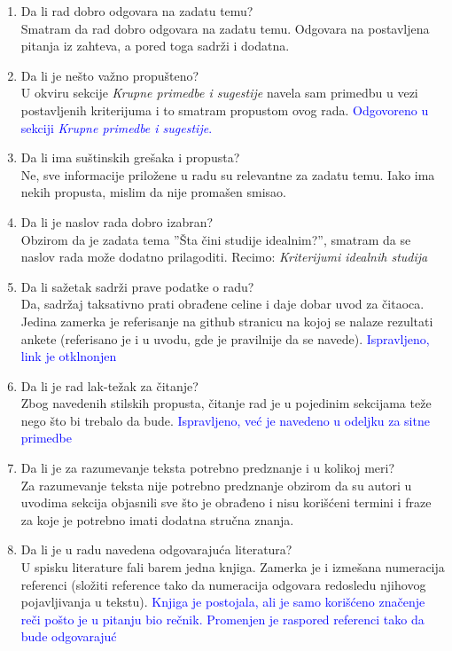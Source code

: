 \documentclass[a4paper]{report}
\newcommand{\odgovor}[1]{\textcolor{blue}{#1}}
\begin{document}
 \begin{enumerate}
 \item Da li rad dobro odgovara na zadatu temu?\\
 Smatram da rad dobro odgovara na zadatu temu. Odgovara na postavljena pitanja iz zahteva, a pored toga sadrži i dodatna.
 
 \item Da li je nešto važno propušteno?\\
 U okviru sekcije \textit{Krupne primedbe i sugestije} navela sam primedbu u vezi postavljenih kriterijuma i to smatram propustom ovog rada.
 \odgovor{Odgovoreno u sekciji \textit{Krupne primedbe i sugestije}.}
 
 \item Da li ima suštinskih grešaka i propusta?\\
 Ne, sve informacije priložene u radu su relevantne za zadatu temu. Iako ima nekih propusta, mislim da nije promašen smisao.
 
 \item Da li je naslov rada dobro izabran?\\
 Obzirom da je zadata tema ''Šta čini studije idealnim?'', smatram da se naslov rada može dodatno prilagoditi. Recimo: \textit{Kriterijumi idealnih studija}
 \odgovor{}
 
 \item Da li sažetak sadrži prave podatke o radu?\\
 Da, sadržaj taksativno prati obrađene celine i daje dobar uvod za čitaoca. Jedina zamerka je referisanje na github stranicu na kojoj se nalaze rezultati ankete (referisano je i u uvodu, gde je pravilnije da se navede).
 \odgovor{Ispravljeno, link je otklnonjen}
 
 \item Da li je rad lak-težak za čitanje?\\
 Zbog navedenih stilskih propusta, čitanje rad je u pojedinim sekcijama teže nego što bi trebalo da bude.
 \odgovor {Ispravljeno, već je navedeno u odeljku za sitne primedbe}
 
 \item Da li je za razumevanje teksta potrebno predznanje i u kolikoj meri?\\
 Za razumevanje teksta nije potrebno predznanje obzirom da su autori u uvodima sekcija objasnili sve što je obrađeno i nisu korišćeni termini i fraze za koje je potrebno imati dodatna stručna znanja.
 
 
 \item Da li je u radu navedena odgovarajuća literatura?\\
 U spisku literature fali barem jedna knjiga. Zamerka je i izmešana numeracija referenci (složiti reference tako da numeracija odgovara redosledu njihovog pojavljivanja u tekstu).
 \odgovor{Knjiga je postojala, ali je samo korišćeno značenje reči pošto je u pitanju bio rečnik. Promenjen je raspored referenci tako da bude odgovarajuć}
 

\end{enumerate}
\end{document}
